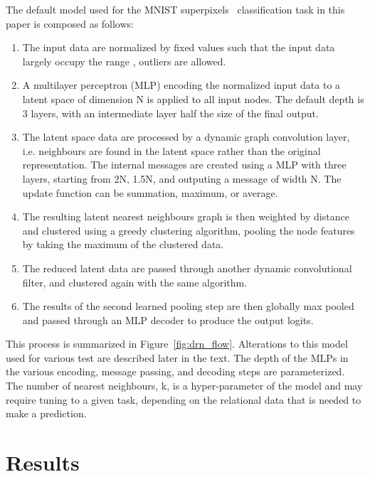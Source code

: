 \documentclass{article}
\begin{document}
The default model used for the MNIST superpixels~\cite{monti2016geometric} classification task in this paper is composed as follows:
\begin{enumerate}
    \item The input data are normalized by fixed values such that the input data largely occupy the range , outliers are allowed.
    \item A multilayer perceptron (MLP) encoding the normalized input data to a latent space of dimension N is applied to all input nodes. The default depth is 3 layers, with an intermediate layer half the size of the final output.
    \item The latent space data are processed by a dynamic graph convolution layer, i.e. neighbours are found in the latent space rather than the original representation. The internal messages are created using a MLP with three layers, starting from 2N, 1.5N, and outputing a message of width N. The update function can be summation, maximum, or average.
    \item The resulting latent nearest neighbours graph is then weighted by distance and clustered using a greedy clustering algorithm, pooling the node features by taking the maximum of the clustered data.
    \item The reduced latent data are passed through another dynamic convolutional filter, and clustered again with the same algorithm.
    \item The results of the second learned pooling step are then globally max pooled and passed through an MLP decoder to produce the output logits.
\end{enumerate}
\noindent
This process is summarized in Figure~\ref{fig:drn_flow}.
Alterations to this model used for various test are described later in the text.
The depth of the MLPs in the various encoding, message passing, and decoding steps are parameterized.
The number of nearest neighbours, k, is a hyper-parameter of the model and may require tuning to a given task, depending on the relational data that is needed to make a prediction.

\section{Results}
\end{document}
